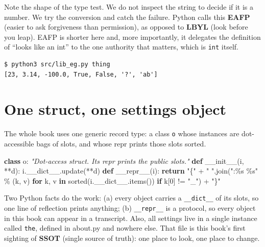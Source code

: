 \documentclass[
  justified]{tufte-book}
\newenvironment{Shaded}{}{}
\newcommand{\BuiltInTok}[1]{\textcolor[rgb]{0.00,0.50,0.00}{#1}}
\newcommand{\CommentTok}[1]{\textcolor[rgb]{0.38,0.63,0.69}{\textit{#1}}}
\newcommand{\ControlFlowTok}[1]{\textcolor[rgb]{0.00,0.44,0.13}{\textbf{#1}}}
\newcommand{\DecValTok}[1]{\textcolor[rgb]{0.25,0.63,0.44}{#1}}
\newcommand{\FunctionTok}[1]{\textcolor[rgb]{0.02,0.16,0.49}{#1}}
\newcommand{\KeywordTok}[1]{\textcolor[rgb]{0.00,0.44,0.13}{\textbf{#1}}}
\newcommand{\NormalTok}[1]{#1}
\newcommand{\OperatorTok}[1]{\textcolor[rgb]{0.40,0.40,0.40}{#1}}
\newcommand{\SpecialCharTok}[1]{\textcolor[rgb]{0.25,0.44,0.63}{#1}}
\newcommand{\StringTok}[1]{\textcolor[rgb]{0.25,0.44,0.63}{#1}}
\begin{document}
Note the shape of the type test. We do not inspect the string to decide
if it is a number. We try the conversion and catch the failure. Python
calls this \textbf{EAFP} (easier to ask forgiveness than permission), as
opposed to \textbf{LBYL} (look before you leap). EAFP is shorter here
and, more importantly, it delegates the definition of ``looks like an
int'' to the one authority that matters, which is \texttt{int} itself.

\begin{verbatim}
$ python3 src/lib_eg.py thing
[23, 3.14, -100.0, True, False, '?', 'ab']
\end{verbatim}

\section{One struct, one settings
object}\label{one-struct-one-settings-object}

The whole book uses one generic record type: a class \texttt{o} whose
instances are dot-accessible bags of slots, and whose repr prints those
slots sorted.

\begin{Shaded}
\begin{Highlighting}[]
\KeywordTok{class}\NormalTok{ o:}
  \CommentTok{"Dot{-}access struct. Its repr prints the public slots."}
  \KeywordTok{def} \FunctionTok{\_\_init\_\_}\NormalTok{(i, }\OperatorTok{**}\NormalTok{d): i.\_\_dict\_\_.update(}\OperatorTok{**}\NormalTok{d)}
  \KeywordTok{def} \FunctionTok{\_\_repr\_\_}\NormalTok{(i):}
    \ControlFlowTok{return} \StringTok{"\{"} \OperatorTok{+} \StringTok{" "}\NormalTok{.join(}\StringTok{":}\SpecialCharTok{\%s}\StringTok{ }\SpecialCharTok{\%s}\StringTok{"} \OperatorTok{\%}\NormalTok{ (k, v)}
      \ControlFlowTok{for}\NormalTok{ k, v }\KeywordTok{in} \BuiltInTok{sorted}\NormalTok{(i.\_\_dict\_\_.items())}
      \ControlFlowTok{if}\NormalTok{ k[}\DecValTok{0}\NormalTok{] }\OperatorTok{!=} \StringTok{"\_"}\NormalTok{) }\OperatorTok{+} \StringTok{"\}"}
\end{Highlighting}
\end{Shaded}

Two Python facts do the work: (a) every object carries a
\texttt{\_\_dict\_\_} of its slots, so one line of reflection prints
anything; (b) \texttt{\_\_repr\_\_} is a protocol, so every object in
this book can appear in a transcript. Also, all settings live in a
single instance called \texttt{the}, defined in about.py and nowhere
else. That file is this book's first sighting of \textbf{SSOT} (single
source of truth): one place to look, one place to change.
\end{document}
